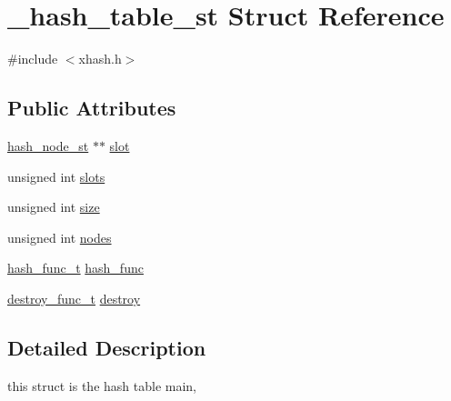 \hypertarget{struct__hash__table__st}{\section{\-\_\-hash\-\_\-table\-\_\-st Struct Reference}
\label{struct__hash__table__st}
}


{\ttfamily \#include $<$xhash.\-h$>$}

\subsection*{Public Attributes}
\begin{DoxyCompactItemize}
\item 
\hyperlink{xhash_8h_aa850c879d934db20a01d0be773a30017}{hash\-\_\-node\-\_\-st} $\ast$$\ast$ \hyperlink{struct__hash__table__st_a51f98610ce851ad0e56d06b21531155f}{slot}
\item 
unsigned int \hyperlink{struct__hash__table__st_afbb7851b13839f24ad916e2a2114255f}{slots}
\item 
unsigned int \hyperlink{struct__hash__table__st_a043f42228ea0b4b5b5c5a27c0d407583}{size}
\item 
unsigned int \hyperlink{struct__hash__table__st_a5eadfd390197f22e359fd73c336795d3}{nodes}
\item 
\hyperlink{xhash_8h_a3f97bf462ddb7a555d27c2babbd0b14e}{hash\-\_\-func\-\_\-t} \hyperlink{struct__hash__table__st_a92de25b041a2a7ee7207469b6a8634e4}{hash\-\_\-func}
\item 
\hyperlink{xhash_8h_a36c92a8aaf906f8b7d0f3521cc0b19eb}{destroy\-\_\-func\-\_\-t} \hyperlink{struct__hash__table__st_aa6a42a3b0b637bb4d9a74f27e19c713f}{destroy}
\end{DoxyCompactItemize}


\subsection{Detailed Description}
this struct is the hash table main, 

